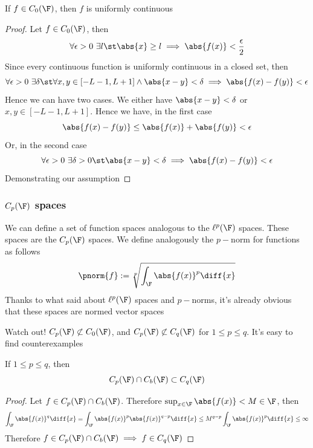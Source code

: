 \documentclass[../mmf.tex]{subfiles}
\begin{document}
\begin{prop}
	If $f\in C_0(\F)$, then $f$ is uniformly continuous
\end{prop}
\begin{proof}
	Let $f\in C_0(\F)$, then
	\begin{equation*}
		\forall\epsilon>0\ \exists l\st \abs{x}\ge l\implies\abs{f(x)}<\frac{\epsilon}{2}
	\end{equation*}
	Since every continuous function is uniformly continuous in a closed set, then
	\begin{equation*}
		\forall\epsilon>0\ \exists\delta\st\forall x,y\in[-L-1,L+1]\wedge\abs{x-y}<\delta\implies\abs{f(x)-f(y)}<\epsilon
	\end{equation*}
	Hence we can have two cases. We either have $\abs{x-y}<\delta$ or $x,y\in[-L-1,L+1]$. Hence we have, in the first case
	\begin{equation*}
		\abs{f(x)-f(y)}\le\abs{f(x)}+\abs{f(y)}<\epsilon
	\end{equation*}
	Or, in the second case
	\begin{equation*}
		\forall\epsilon>0\ \exists\delta>0\st\abs{x-y}<\delta\implies\abs{f(x)-f(y)}<\epsilon
	\end{equation*}
	Demonstrating our assumption
\end{proof}
\subsubsection{$C_p(\F)$ spaces}
\begin{dfn}
	We can define a set of function spaces analogous to the $\ell^p(\F)$ spaces. These spaces are the $C_p(\F)$ spaces. We define analogously the $p-$norm for functions as follows
	\begin{equation}
		\pnorm{f}:=\sqrt[p]{\int_{\F}\abs{f(x)}^p\diff{x}}
		\label{eq:funpnorm}
	\end{equation}
	Thanks to what said about $\ell^p(\F)$ spaces and $p-$norms, it's already obvious that these spaces are normed vector spaces
\end{dfn}
\begin{rmk}
	Watch out! $C_p(\F)\not\subset C_0(\F)$, and $C_p(\F)\not\subset C_q(\F)$ for $1\le p\le q$. It's easy to find counterexamples
\end{rmk}
\begin{prop}
	If $1\le p\le q$, then
	\begin{equation*}
		C_p(\F)\cap C_b(\F)\subset C_q(\F)
	\end{equation*}
\end{prop}
\begin{proof}
	Let $f\in C_p(\F)\cap C_b(\F)$. Therefore $\sup_{x\in\F}\abs{f(x)}<M\in\F$, then
	\begin{equation*}
		\int_{\F}\abs{f(x)}^q\diff{x}=\int_{\F}^{}\abs{f(x)}^p\abs{f(x)}^{q-p}\diff{x}\le M^{q-p}\int_{\F}\abs{f(x)}^p\diff{x}\le\infty
	\end{equation*}
	Therefore $f\in C_p(\F)\cap C_b(\F)\implies f\in C_q(\F)$
\end{proof}
\end{document}
